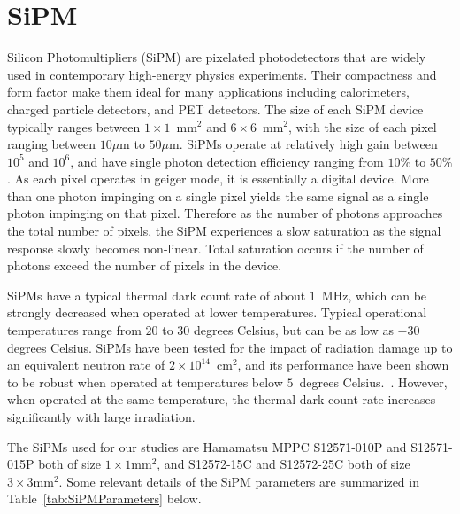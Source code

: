 \section{SiPM}
\label{sec:sipm}

Silicon Photomultipliers (SiPM) are pixelated photodetectors that are widely
used in contemporary high-energy physics experiments. Their compactness and form
factor make them ideal for many applications including calorimeters, charged
particle detectors, and PET detectors. The size of each SiPM device typically
ranges between $1\times 1$~$\mathrm{mm}^{2}$ and $6\times 6$~$\mathrm{mm}^{2}$,
with the size of each pixel ranging between $10\mu$m to $50\mu$m. SiPMs operate
at relatively high gain between $10^{5}$ and $10^{6}$, and have single photon detection
efficiency ranging from $10\%$ to $50\%$. As each pixel operates in geiger mode, it is essentially a digital
device. More than one photon impinging on a single pixel yields the same signal
as a single photon impinging on that pixel. Therefore as the number of photons
approaches the total number of pixels, the SiPM experiences a slow saturation as
the signal response slowly becomes non-linear. Total saturation occurs 
if the number of photons exceed the number of pixels in the device. 


SiPMs have a typical thermal dark count rate of about $1$~MHz, which can be
strongly decreased when operated at lower temperatures. Typical operational
temperatures range from $20$ to $30$ degrees Celsius, but can be as low as $-30$
degrees Celsius. SiPMs have been tested for the impact of radiation damage up to
an equivalent neutron rate of $2\times10^{14}$~$\mathrm{cm}^{2}$, and its
performance have been shown to be robust when operated at temperatures below 
$5$~degrees Celsius.~\cite{SiPMIrradiated1,SiPMIrradiated2}. 
However, when operated at the same temperature, the thermal dark count rate increases
significantly with large irradiation.

The SiPMs used for our studies are Hamamatsu MPPC S12571-010P and S12571-015P both of 
size $1\times1\mathrm{mm}^{2}$, and S12572-15C and S12572-25C both of size 
$3\times3\mathrm{mm}^{2}$. Some relevant details of the SiPM parameters
are summarized in Table~\ref{tab:SiPMParameters} below.

